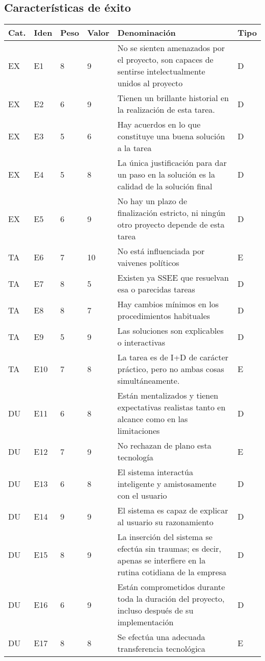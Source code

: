 \subsection{Características de éxito}
\begin{longtable}{ | l | l | l | l | p{8cm} | l | }
  \hline
  Cat. & Iden & Peso & Valor & Denominación & Tipo \\ \hline
  EX & E1 & 8 & 9 & No se sienten amenazados por el proyecto, son capaces de sentirse intelectualmente unidos al proyecto & D \\ \hline
  EX & E2 & 6 & 9 & Tienen un brillante historial en la realización de esta tarea.  & D \\ \hline
  EX & E3 & 5 & 6 & Hay acuerdos en lo que constituye una buena solución a la tarea & D \\ \hline
  EX & E4 & 5 & 8 & La única justificación para dar un paso en la solución es la calidad de la solución final & D \\ \hline
  EX & E5 & 6 & 9 & No hay un plazo de finalización estricto, ni ningún otro proyecto depende de esta tarea & D \\ \hline
  TA & E6 & 7 & 10 & No está influenciada por vaivenes políticos & E \\ \hline
  TA & E7 & 8 & 5 & Existen ya SSEE que resuelvan esa o parecidas tareas & D \\ \hline
  TA & E8 & 8 & 7 & Hay cambios mínimos en los procedimientos habituales & D \\ \hline
  TA & E9 & 5 & 9 & Las soluciones son explicables o interactivas & D \\ \hline
  TA & E10 & 7 & 8 & La tarea es de I+D de carácter práctico, pero no ambas cosas simultáneamente.  & E \\ \hline
  DU & E11 & 6 & 8 & Están mentalizados y tienen expectativas realistas tanto en alcance como en las limitaciones & D \\ \hline
  DU & E12 & 7 & 9 & No rechazan de plano esta tecnología & E \\ \hline
  DU & E13 & 6 & 8 & El sistema interactúa inteligente y amistosamente con el usuario & D \\ \hline
  DU & E14 & 9 & 9 & El sistema es capaz de explicar al usuario su razonamiento & D \\ \hline
  DU & E15 & 8 & 9 & La inserción del sistema se efectúa sin traumas; es decir, apenas se interfiere en la rutina cotidiana de la empresa & D \\ \hline
  DU & E16 & 6 & 9 & Están comprometidos durante toda la duración del proyecto, incluso después de su implementación & D \\ \hline
  DU & E17 & 8 & 8 & Se efectúa una adecuada transferencia tecnológica & E \\ \hline
\end{longtable}

